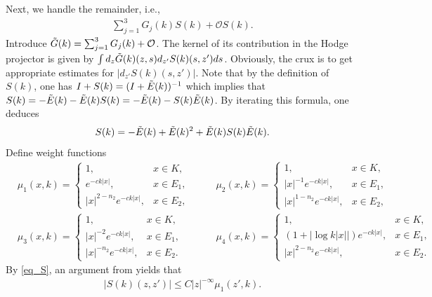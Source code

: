\documentclass[12pt]{amsart}
\newcommand{\com}[1]{\vskip.3cm
	\fbox{%
		\color{red}
		\parbox{0.93\linewidth}{\footnotesize #1}}
	\vskip.3cm}
\begin{document}
Next, we handle the remainder, i.e., 
\begin{align*}
    \sum_{j=1}^3 G_j(k)S(k) + \mathcal{O}S(k).
\end{align*}
Introduce $\Tilde{G}(k) = \sum_{j=1}^3 G_j(k) + \mathcal{O}$. The kernel of its contribution in the Hodge projector is given by $\int d_z \Tilde{G}(k)(z,s) d_{z'}S(k)(s,z') ds$. Obviously, the crux is to get appropriate estimates for $|d_{z'}S(k)(s,z')|$. Note that by the definition of $S(k)$, one has $I+S(k) = (I+\Tilde{E}(k))^{-1}$ which implies that $S(k) = -\Tilde{E}(k) - \Tilde{E}(k)S(k) = -\Tilde{E}(k) - S(k) \Tilde{E}(k)$. By iterating this formula, one deduces
\begin{align}\label{eq_S}
    S(k) = -\Tilde{E}(k) + \Tilde{E}(k)^2 + \Tilde{E}(k) S(k) \Tilde{E}(k).
\end{align}
Define weight functions
\begin{align*}
    &\mu_1(x,k) = \begin{cases}
        1, & x\in K,\\
        e^{-ck|x|}, & x\in E_1,\\
        |x|^{2-n_2}e^{-ck|x|}, & x\in E_2,
    \end{cases}
    \quad &&\mu_2(x,k) = \begin{cases}
        1, & x\in K,\\
        |x|^{-1}e^{-ck|x|}, & x\in E_1,\\
        |x|^{1-n_2}e^{-ck|x|}, & x\in E_2,
    \end{cases}\\
    &\mu_3(x,k) = \begin{cases}
        1, & x\in K,\\
        |x|^{-2}e^{-ck|x|}, & x\in E_1,\\
        |x|^{-n_2}e^{-ck|x|}, & x\in E_2.
    \end{cases} \quad &&\mu_4(x,k) = \begin{cases}
        1, &x\in K,\\
        (1+|\log{k|x|}|) e^{-ck|x|}, &x\in E_1,\\
        |x|^{2-n_2}e^{-ck|x|}, & x\in E_2.
    \end{cases}
\end{align*}
By \eqref{eq_S}, an argument from \cite[Page 22]{HNS} yields that
\begin{align}\label{eq_S(k)}
    |S(k)(z,z')| \le C |z|^{-\infty} \mu_1(z',k).
\end{align}
\end{document}
